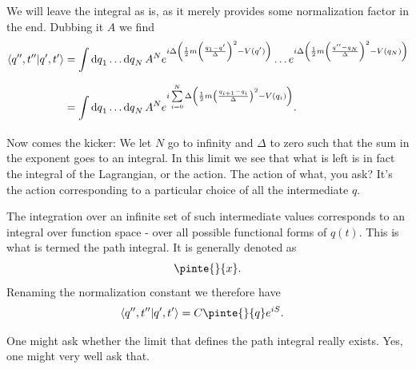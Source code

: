 We will leave the integral as is, as it merely provides some normalization factor in the end. Dubbing it $A$ we find
\begin{align*}
	\braket{q^{\prime\prime}, t^{\prime\prime}}{q^{\prime}, t^{\prime}} &= \int\limits_{}^{}\dd{q}_{1}\dots\dd{q}_{N}A^{N}e^{i\Delta\left(\frac{1}{2}m\left(\frac{q_{1} - q^{\prime}}{\Delta}\right)^{2} - V(q^{\prime})\right)}\dots e^{i\Delta\left(\frac{1}{2}m\left(\frac{q^{\prime\prime} - q_{N}}{\Delta}\right)^{2} - V(q_{N})\right)} \\
	                                                      &= \int\limits_{}^{}\dd{q}_{1}\dots\dd{q}_{N}A^{N}e^{i\sum\limits_{i = 0}^{N}\Delta\left(\frac{1}{2}m\left(\frac{q_{i + 1} - q_{i}}{\Delta}\right)^{2} - V(q_{i})\right)}.
\end{align*}
Now comes the kicker: We let $N$ go to infinity and $\Delta$ to zero such that the sum in the exponent goes to an integral. In this limit we see that what is left is in fact the integral of the Lagrangian, or the action. The action of what, you ask? It's the action corresponding to a particular choice of all the intermediate $q$.

The integration over an infinite set of such intermediate values corresponds to an integral over function space - over all possible functional forms of $q(t)$. This is what is termed the path integral. It is generally denoted as
\begin{align*}
	\pinte{}{x}.
\end{align*}
Renaming the normalization constant we therefore have
\begin{align*}
	\braket{q^{\prime\prime}, t^{\prime\prime}}{q\p, t\p} &= C\pinte{}{q}e^{iS}.
\end{align*}

One might ask whether the limit that defines the path integral really exists. Yes, one might very well ask that.


